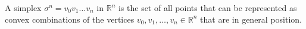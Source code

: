 A simplex $\sigma^n = v_0v_1\ldots v_n$ in $\mathbb{R}^n$ is the set of all points that can be represented as convex combinations of the vertices $v_0, v_1, \ldots, v_n \in \mathbb{R}^n$ that are in general position.

